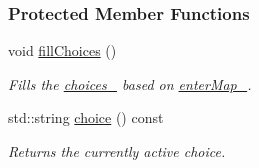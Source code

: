 \subsubsection*{Protected Member Functions}
\begin{DoxyCompactItemize}
\item 
void \hyperlink{structslb_1_1core_1_1ui_1_1MenuBase_a67b7eded3ecf04b43f4da92b53a5ae57}{fill\+Choices} ()\hypertarget{structslb_1_1core_1_1ui_1_1MenuBase_a67b7eded3ecf04b43f4da92b53a5ae57}{}\label{structslb_1_1core_1_1ui_1_1MenuBase_a67b7eded3ecf04b43f4da92b53a5ae57}

\begin{DoxyCompactList}\small\item\em Fills the \hyperlink{structslb_1_1core_1_1ui_1_1MenuBase_a5ada6ccb413d170b2899125ebce9f9b0}{choices\+\_\+} based on \hyperlink{structslb_1_1core_1_1ui_1_1MenuBase_a1d0c310785fbde8da82aa0e218094050}{enter\+Map\+\_\+}. \end{DoxyCompactList}\item 
std\+::string \hyperlink{structslb_1_1core_1_1ui_1_1MenuBase_a43a378664d6004ac84c2a3ce21d88f75}{choice} () const 
\begin{DoxyCompactList}\small\item\em Returns the currently active choice. \end{DoxyCompactList}\end{DoxyCompactItemize}
